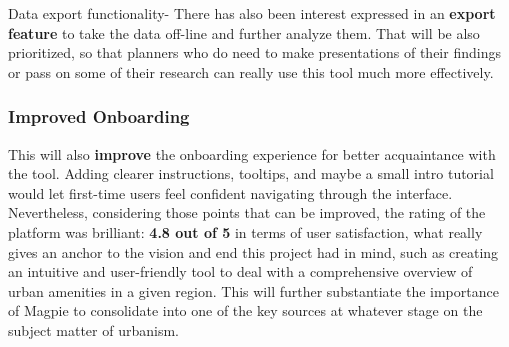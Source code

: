Data export functionality- There has also been interest expressed in an \textbf{export feature} to take the data off{-}line and further analyze them. That will be also prioritized, so that planners who do need to make presentations of their findings or pass on some of their research can really use this tool much more effectively.

\subsubsection{Improved Onboarding}

This will also \textbf{improve} the onboarding experience for better acquaintance with the tool. Adding clearer instructions, tooltips, and maybe a small intro tutorial would let first{-}time users feel confident navigating through the interface. Nevertheless, considering those points that can be improved, the rating of the platform was brilliant: \textbf{4.8 out of 5} in terms of user satisfaction, what really gives an anchor to the vision and end this project had in mind, such as creating an intuitive and user{-}friendly tool to deal with a comprehensive overview of urban amenities in a given region. This will further substantiate the importance of Magpie to consolidate into one of the key sources at whatever stage on the subject matter of urbanism.